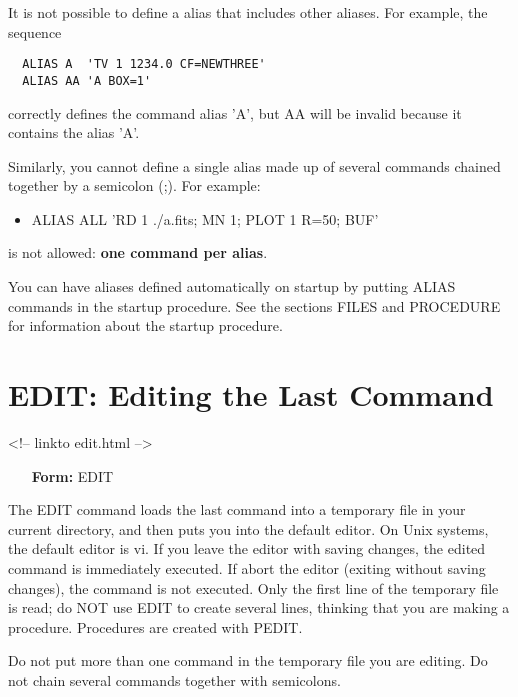 It is not possible to define a alias that includes other aliases.  For
example, the sequence
\begin{verbatim}
  ALIAS A  'TV 1 1234.0 CF=NEWTHREE'
  ALIAS AA 'A BOX=1'
\end{verbatim}
correctly defines the command alias 'A', but AA will be invalid because it
contains the alias 'A'.

Similarly, you cannot define a single alias made up of several commands
chained together by a semicolon (;).  For example:
\begin{itemize}
  \item{ALIAS ALL 'RD 1 ./a.fits; MN 1; PLOT 1 R=50; BUF'}
\end{itemize}
is not allowed: \textbf{one command per alias}.

You can have aliases defined automatically on startup by putting ALIAS
commands in the startup procedure.  See the sections FILES and PROCEDURE
for information about the startup procedure.

\section{EDIT: Editing the Last Command}
\begin{rawhtml}
<!-- linkto edit.html -->
\end{rawhtml}


\begin{itemize}
  \item[\textbf{Form: }EDIT\hfill]{}
\end{itemize}

The EDIT command loads the last command into a temporary file in your
current directory, and then puts you into the default editor.  On Unix
systems, the default editor is vi.  If you leave the editor with saving
changes, the edited command is immediately executed.  If abort the editor
(exiting without saving changes), the command is not executed. Only the
first line of the temporary file is read; do NOT use EDIT to create several
lines, thinking that you are making a procedure.  Procedures are created
with PEDIT.

Do not put more than one command in the temporary file you are editing.  Do
not chain several commands together with semicolons.

